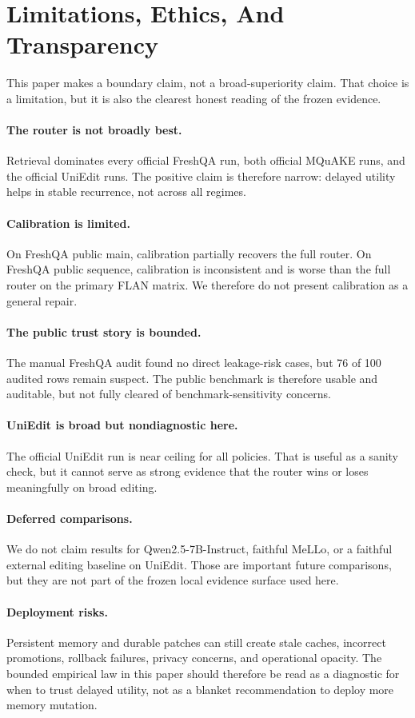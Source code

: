 \section{Limitations, Ethics, And Transparency}

This paper makes a boundary claim, not a broad-superiority claim. That choice is a limitation, but it is also the clearest honest reading of the frozen evidence.

\paragraph{The router is not broadly best.}
Retrieval dominates every official FreshQA run, both official MQuAKE runs, and the official UniEdit runs. The positive claim is therefore narrow: delayed utility helps in stable recurrence, not across all regimes.

\paragraph{Calibration is limited.}
On FreshQA public main, calibration partially recovers the full router. On FreshQA public sequence, calibration is inconsistent and is worse than the full router on the primary FLAN matrix. We therefore do not present calibration as a general repair.

\paragraph{The public trust story is bounded.}
The manual FreshQA audit found no direct leakage-risk cases, but 76 of 100 audited rows remain suspect. The public benchmark is therefore usable and auditable, but not fully cleared of benchmark-sensitivity concerns.

\paragraph{UniEdit is broad but nondiagnostic here.}
The official UniEdit run is near ceiling for all policies. That is useful as a sanity check, but it cannot serve as strong evidence that the router wins or loses meaningfully on broad editing.

\paragraph{Deferred comparisons.}
We do not claim results for Qwen2.5-7B-Instruct, faithful MeLLo, or a faithful external editing baseline on UniEdit. Those are important future comparisons, but they are not part of the frozen local evidence surface used here.

\paragraph{Deployment risks.}
Persistent memory and durable patches can still create stale caches, incorrect promotions, rollback failures, privacy concerns, and operational opacity. The bounded empirical law in this paper should therefore be read as a diagnostic for when to trust delayed utility, not as a blanket recommendation to deploy more memory mutation.
